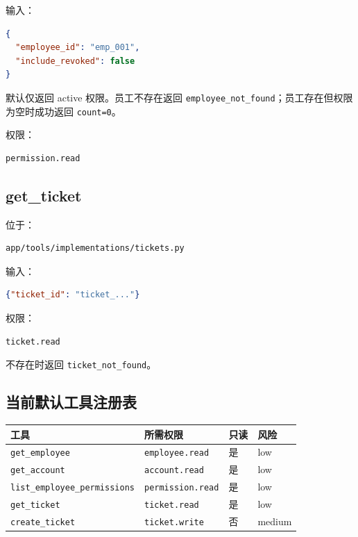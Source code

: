 \documentclass[11pt,a4paper]{ctexart}
\begin{document}
输入：

\begin{lstlisting}[language=JSON]
{
  "employee_id": "emp_001",
  "include_revoked": false
}
\end{lstlisting}

默认仅返回 active 权限。员工不存在返回
\texttt{employee\_not\_found}；员工存在但权限为空时成功返回
\texttt{count=0}。

权限：

\begin{lstlisting}
permission.read
\end{lstlisting}

\subsection{get\_ticket}

位于：

\begin{lstlisting}
app/tools/implementations/tickets.py
\end{lstlisting}

输入：

\begin{lstlisting}[language=JSON]
{"ticket_id": "ticket_..."}
\end{lstlisting}

权限：

\begin{lstlisting}
ticket.read
\end{lstlisting}

不存在时返回 \texttt{ticket\_not\_found}。

\subsection{当前默认工具注册表}

\begin{longtable}{p{4cm}p{3cm}p{2.3cm}p{2.5cm}}
\toprule
工具 & 所需权限 & 只读 & 风险 \\
\midrule
\texttt{get\_employee} & \texttt{employee.read} & 是 & low \\
\texttt{get\_account} & \texttt{account.read} & 是 & low \\
\texttt{list\_employee\_permissions} & \texttt{permission.read} & 是 & low \\
\texttt{get\_ticket} & \texttt{ticket.read} & 是 & low \\
\texttt{create\_ticket} & \texttt{ticket.write} & 否 & medium \\
\bottomrule
\end{longtable}
\end{document}
